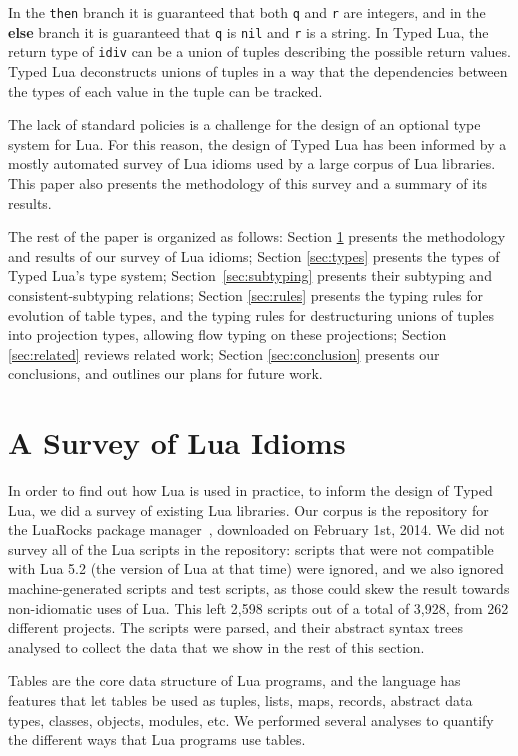 \documentclass{sigplanconf}
\begin{document}
In the {\tt then} branch it is guaranteed that both {\tt q}
and {\tt r} are integers, and in the {\bf else} branch it is
guaranteed that {\tt q} is {\tt nil} and {\tt r} is a string.
In Typed Lua, the return type of {\tt idiv} can be a union of
tuples describing the possible return values. Typed Lua deconstructs unions of tuples in a way that the dependencies between the types of each value in the tuple can be tracked.

The lack of standard policies is a challenge for the design of
an optional type system for Lua. For this reason, the design
of Typed Lua has been informed by a mostly automated survey
of Lua idioms used by a large corpus of Lua libraries.
This paper also presents the methodology of this survey and
a summary of its results.

The rest of the paper is organized as follows:
Section \ref{sec:statistics} presents the methodology and results of
our survey of Lua idioms;
Section \ref{sec:types} presents the types of Typed Lua's
type system; Section~\ref{sec:subtyping} presents
their subtyping and consistent-subtyping relations;
Section \ref{sec:rules} presents the typing rules for evolution of table types,
and the typing rules for destructuring unions of tuples into projection types,
allowing flow typing on these projections;
Section \ref{sec:related} reviews related work;
Section \ref{sec:conclusion} presents our conclusions,
and outlines our plans for future work.

\section{A Survey of Lua Idioms}
\label{sec:statistics}

In order to find out how Lua is used in practice, to inform
the design of Typed Lua, we did a survey of existing Lua
libraries. Our corpus is the repository for the LuaRocks
package manager~\cite{hisham2013luarocks}, downloaded on
February 1st, 2014. We did not survey all of the Lua
scripts in the repository: scripts that were not compatible
with Lua 5.2 (the version of Lua at that time) were ignored,
and we also ignored machine-generated scripts and test scripts,
as those could skew the result towards non-idiomatic uses
of Lua. This left 2,598 scripts out of a total of 3,928, from
262 different projects. The scripts were parsed, and their
abstract syntax trees analysed to collect the data that we
show in the rest of this section.

Tables are the core data structure of Lua programs, and
the language has features that let tables be used as
tuples, lists, maps, records, abstract data types, classes,
objects, modules, etc. We performed several analyses to
quantify the different ways that Lua programs use tables.
\end{document}
